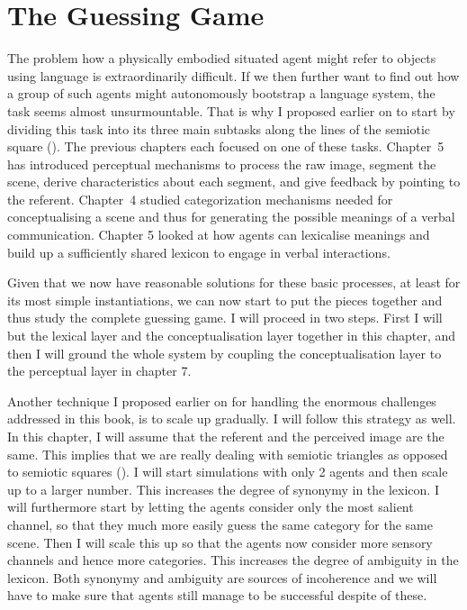 \chapter{The Guessing Game}

The problem how a physically embodied situated agent
might refer to objects using language is extraordinarily 
difficult. If we then further want to find out how 
a group of such agents might autonomously bootstrap
a language system, the task seems almost unsurmountable. 
That is why I proposed earlier on to start by dividing
this task into its three main subtasks along the lines
of the semiotic square ().
The previous chapters each focused on one of these tasks. 
Chapter~5 has introduced 
perceptual mechanisms to process the raw image, segment
the scene, derive characteristics about each 
segment, and give feedback by pointing to the referent. 
Chapter~4 studied categorization mechanisms
needed for conceptualising a scene and thus for 
generating the possible meanings of a verbal
communication. Chapter 5 looked at how agents can 
lexicalise meanings and build up a sufficiently shared
lexicon to engage in verbal interactions. 

Given that we now have reasonable solutions for these
basic processes, at least for its most simple instantiations, 
we can now start to put the pieces together and thus
study the complete guessing game. I will 
proceed in two steps. First I will but the lexical 
layer and the conceptualisation layer together in 
this chapter, and then I will ground the whole system 
by coupling the conceptualisation layer to the 
perceptual layer in chapter 7. 

Another technique I proposed earlier on 
for handling the enormous challenges addressed in 
this book, is to scale up 
gradually. I will follow this strategy as well. In this
chapter, I will assume that the referent and the 
perceived image are the same. This implies that we 
are really dealing with semiotic triangles as 
opposed to semiotic squares (). 
I will start simulations with only 2 agents and then 
scale up to a larger number. This increases the degree
of synonymy in the lexicon. I will furthermore
start by letting the agents 
consider only the most salient channel, so that 
they much more easily guess the same category for the 
same scene. Then I will scale this up so that 
the agents now consider more sensory channels and hence
more categories. This increases the degree of 
ambiguity in the lexicon. Both synonymy and ambiguity 
are sources of incoherence and we will have to make
sure that agents still manage to be successful 
despite of these. 

